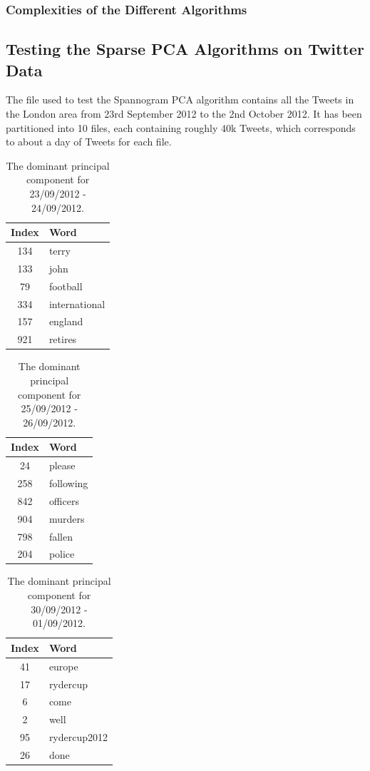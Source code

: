 \documentclass[11pt,a4paper]{article}
\begin{document}
\subsubsection{Complexities of the Different Algorithms}

\subsection{Testing the Sparse PCA Algorithms on Twitter Data}
\label{testing_twitter}
The file used to test the Spannogram PCA algorithm contains all the Tweets in the London area from 23rd September 2012 to the 2nd October 2012. It has been partitioned into 10 files, each containing roughly 40k Tweets, which corresponds to about a day of Tweets for each file.

\begin{table}[H]
\center
\begin{tabular}{| c l |}
\hline
Index & Word \\
\hline
134 & terry\\
133 & john\\
79 & football\\
334 & international\\
157 & england\\
921 & retires\\
\hline
\end{tabular}
\caption{The dominant principal component for 23/09/2012 - 24/09/2012.}
\label{john_terry}
\end{table}

\begin{table}[H]
\center
\begin{tabular}{| c l |}
\hline
Index & Word \\
\hline
24 & please\\
258 & following\\
842 & officers\\
904 & murders\\
798 & fallen\\
204 & police\\
\hline
\end{tabular}
\caption{The dominant principal component for 25/09/2012 - 26/09/2012.}
\label{murder}
\end{table}

\begin{table}[H]
\center
\begin{tabular}{| c l |}
\hline
Index & Word \\
\hline
41 & europe\\
17 & rydercup\\
6 & come\\
2 & well\\
95 & rydercup2012\\
26 & done\\
\hline
\end{tabular}
\caption{The dominant principal component for 30/09/2012 - 01/09/2012.}
\label{ryder_cup}
\end{table}
\end{document}
